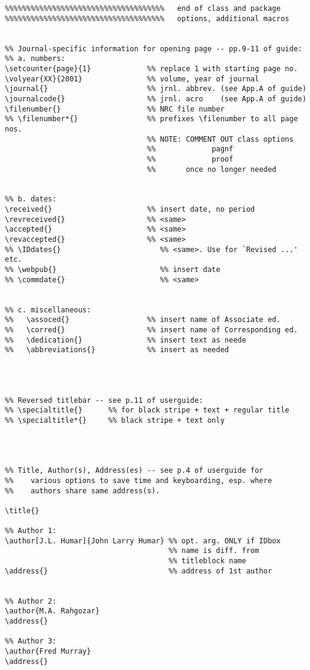 \begin{verbatim}
%%%%%%%%%%%%%%%%%%%%%%%%%%%%%%%%%%%%%   end of class and package 
%%%%%%%%%%%%%%%%%%%%%%%%%%%%%%%%%%%%%   options, additional macros


%% Journal-specific information for opening page -- pp.9-11 of guide:
%% a. numbers:
\setcounter{page}{1}             %% replace 1 with starting page no.
\volyear{XX}{2001}               %% volume, year of journal 
\journal{}                       %% jrnl. abbrev. (see App.A of guide)
\journalcode{}                   %% jrnl. acro    (see App.A of guide)
\filenumber{}                    %% NRC file number
%% \filenumber*{}                %% prefixes \filenumber to all page nos.
                                 %% NOTE: COMMENT OUT class options
                                 %%             pagnf
                                 %%             proof
                                 %%       once no longer needed


%% b. dates:
\received{}                      %% insert date, no period
\revreceived{}                   %% <same>
\accepted{}                      %% <same>
\revaccepted{}                   %% <same>
%% \IDdates{}                       %% <same>. Use for `Revised ...' etc.
%% \webpub{}                        %% insert date
%% \commdate{}                      %% <same>


%% c. miscellaneous:
%%   \assoced{}                  %% insert name of Associate ed.
%%   \corred{}                   %% insert name of Corresponding ed.
%%   \dedication{}               %% insert text as neede
%%   \abbreviations{}            %% insert as needed




%% Reversed titlebar -- see p.11 of userguide:
%% \specialtitle{}      %% for black stripe + text + regular title
%% \specialtitle*{}     %% black stripe + text only




%% Title, Author(s), Address(es) -- see p.4 of userguide for 
%%    various options to save time and keyboarding, esp. where
%%    authors share same address(s). 

\title{} 

%% Author 1:
\author[J.L. Humar]{John Larry Humar} %% opt. arg. ONLY if IDbox
                                      %% name is diff. from
                                      %% titleblock name 
\address{}                            %% address of 1st author


%% Author 2:
\author{M.A. Rahgozar}
\address{}

%% Author 3:
\author{Fred Murray}
\address{}



\end{verbatim}
